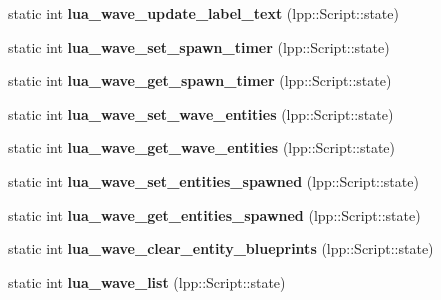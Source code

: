 \begin{DoxyCompactItemize}
\item 
static int {\bfseries lua\+\_\+wave\+\_\+update\+\_\+label\+\_\+text} (lpp\+::\+Script\+::state)\hypertarget{class_lua_interface_ae7f19bbe9dc2caa29a212c56a64743c6}{}\label{class_lua_interface_ae7f19bbe9dc2caa29a212c56a64743c6}

\item 
static int {\bfseries lua\+\_\+wave\+\_\+set\+\_\+spawn\+\_\+timer} (lpp\+::\+Script\+::state)\hypertarget{class_lua_interface_a4dc7d652e3759b25ae77f379ae2efb38}{}\label{class_lua_interface_a4dc7d652e3759b25ae77f379ae2efb38}

\item 
static int {\bfseries lua\+\_\+wave\+\_\+get\+\_\+spawn\+\_\+timer} (lpp\+::\+Script\+::state)\hypertarget{class_lua_interface_a35c0f637496e485d5927dfc743ec8f20}{}\label{class_lua_interface_a35c0f637496e485d5927dfc743ec8f20}

\item 
static int {\bfseries lua\+\_\+wave\+\_\+set\+\_\+wave\+\_\+entities} (lpp\+::\+Script\+::state)\hypertarget{class_lua_interface_aa97447f751bc3a787b1f478280b0eb7b}{}\label{class_lua_interface_aa97447f751bc3a787b1f478280b0eb7b}

\item 
static int {\bfseries lua\+\_\+wave\+\_\+get\+\_\+wave\+\_\+entities} (lpp\+::\+Script\+::state)\hypertarget{class_lua_interface_a08bd76d9debea1d264e3681b5507120c}{}\label{class_lua_interface_a08bd76d9debea1d264e3681b5507120c}

\item 
static int {\bfseries lua\+\_\+wave\+\_\+set\+\_\+entities\+\_\+spawned} (lpp\+::\+Script\+::state)\hypertarget{class_lua_interface_a80f4d6a793054c1dfa3266f7c15a5779}{}\label{class_lua_interface_a80f4d6a793054c1dfa3266f7c15a5779}

\item 
static int {\bfseries lua\+\_\+wave\+\_\+get\+\_\+entities\+\_\+spawned} (lpp\+::\+Script\+::state)\hypertarget{class_lua_interface_a7486e1047d6069df072b987af60f929c}{}\label{class_lua_interface_a7486e1047d6069df072b987af60f929c}

\item 
static int {\bfseries lua\+\_\+wave\+\_\+clear\+\_\+entity\+\_\+blueprints} (lpp\+::\+Script\+::state)\hypertarget{class_lua_interface_a1bd060333074ba2c05d1ad11fd3eeecb}{}\label{class_lua_interface_a1bd060333074ba2c05d1ad11fd3eeecb}

\item 
static int {\bfseries lua\+\_\+wave\+\_\+list} (lpp\+::\+Script\+::state)\hypertarget{class_lua_interface_aa48da30de7f6e0fbdf514ac9bd6436ef}{}\label{class_lua_interface_aa48da30de7f6e0fbdf514ac9bd6436ef}


\end{DoxyCompactItemize}
